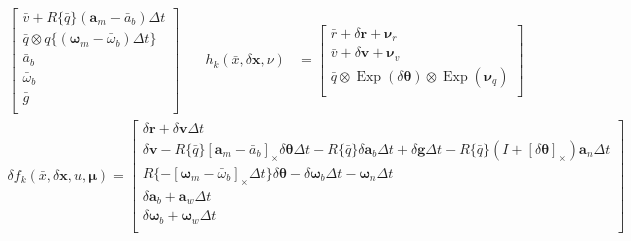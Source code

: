 \documentclass[12pt]{article}
\begin{document}
{\begin{equation}
\begin{aligned}
\begin{bmatrix}
            \bar{v} + R\{\bar{q}\} (\pmb{a}_{m} - \bar{a}_{b}) \Delta t        \\
            \bar{q} \otimes q\{(\pmb{\omega}_{m} - \bar{\omega}_{b})\Delta t\} \\
            \bar{a}_{b}                                                        \\
            \bar{\omega}_{b}                                                   \\
            \bar{g}                                                            \\
        \end{bmatrix}
    \end{aligned}
    \quad
    \begin{aligned}
        h_k(\bar{x}, \delta\pmb{x}, \nu) & =\begin{bmatrix}
            \bar{r} + \delta\pmb{r}+\pmb{\nu}_{r}                                                            \\
            \bar{v} + \delta\pmb{v}+\pmb{\nu}_{v}                                                            \\
            \bar{q} \otimes \operatorname{Exp}(\delta\pmb{\theta}) \otimes \operatorname{Exp}(\pmb{\nu}_{q}) \\
        \end{bmatrix}
    \end{aligned}
\end{equation}
\begin{equation}
    \begin{aligned}
        \delta f_k(\bar{x},\delta \pmb{x}, u, \pmb{\mu})=\begin{bmatrix}
            \delta\pmb{r} + \delta\pmb{v} \Delta t                             \\
            \delta \pmb{v}
            - R\{\bar{q}\} [\pmb{a}_{m} - \bar{a}_{b}]_\times\delta\pmb{\theta} \Delta t
            - R\{\bar{q}\} \delta\pmb{a}_{b} \Delta t
            + \delta\pmb{g} \Delta t
            - R\{\bar{q}\}(I+[\delta\pmb{\theta}]_\times) \pmb{a}_{n} \Delta t \\
            R\{-[\pmb{\omega}_{m} - \bar{\omega}_{b}]_\times \Delta t\} \delta \pmb{\theta}
            - \delta \pmb{\omega}_{b} \Delta t
            - \pmb{\omega}_{n} \Delta t                                        \\
            \delta\pmb{a}_{b} + \pmb{a}_{w} \Delta t                           \\
            \delta\pmb{\omega}_{b} + \pmb{\omega}_{w} \Delta t                 \\

\end{bmatrix}
\end{aligned}
\end{equation}}
\end{document}
